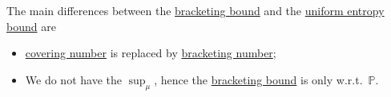 \begin{remark}
	The main differences between the \hyperref[thm:bracketing-bound]{bracketing bound} and the \hyperref[thm:uniform-entropy-integral-bound]{uniform entropy bound} are
	\begin{itemize}
		\item \hyperref[def:covering-number]{covering number} is replaced by \hyperref[def:bracketing-number]{bracketing number};
		\item We do not have the \(\sup _\mu \), hence the \hyperref[thm:bracketing-bound]{bracketing bound} is only w.r.t.\ \(\mathbb{P} \).
	\end{itemize}
\end{remark}